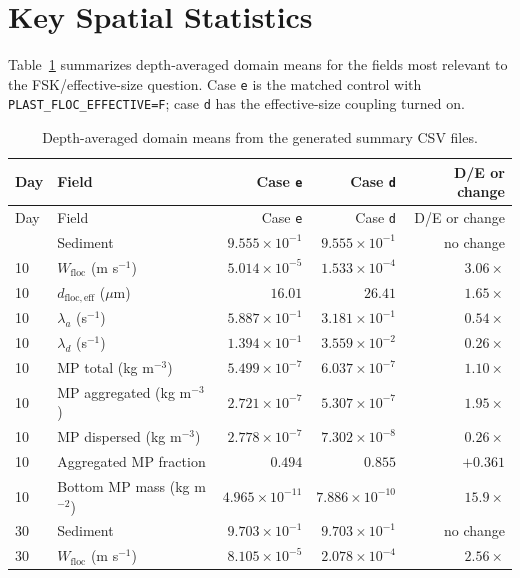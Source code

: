 \documentclass[11pt]{article}
\begin{document}
\section*{Key Spatial Statistics}

Table~\ref{tab:stats} summarizes depth-averaged domain means for the fields
most relevant to the FSK/effective-size question.  Case \texttt{e} is the
matched control with \texttt{PLAST\_FLOC\_EFFECTIVE=F}; case \texttt{d} has
the effective-size coupling turned on.

\small
\begin{longtable}{llrrr}
\caption{Depth-averaged domain means from the generated summary CSV files.}
\label{tab:stats}\\
\toprule
Day & Field & Case \texttt{e} & Case \texttt{d} & D/E or change \\
\midrule
\endfirsthead
\toprule
Day & Field & Case \texttt{e} & Case \texttt{d} & D/E or change \\
\midrule
\endhead
\bottomrule
\endfoot
10 & Sediment & $9.555{\times}10^{-1}$ & $9.555{\times}10^{-1}$ & no change \\
10 & $W_{\mathrm{floc}}$ (m s$^{-1}$) & $5.014{\times}10^{-5}$ & $1.533{\times}10^{-4}$ & $3.06{\times}$ \\
10 & $d_{\mathrm{floc,eff}}$ ($\mu$m) & $16.01$ & $26.41$ & $1.65{\times}$ \\
10 & $\lambda_a$ (s$^{-1}$) & $5.887{\times}10^{-1}$ & $3.181{\times}10^{-1}$ & $0.54{\times}$ \\
10 & $\lambda_d$ (s$^{-1}$) & $1.394{\times}10^{-1}$ & $3.559{\times}10^{-2}$ & $0.26{\times}$ \\
10 & MP total (kg m$^{-3}$) & $5.499{\times}10^{-7}$ & $6.037{\times}10^{-7}$ & $1.10{\times}$ \\
10 & MP aggregated (kg m$^{-3}$) & $2.721{\times}10^{-7}$ & $5.307{\times}10^{-7}$ & $1.95{\times}$ \\
10 & MP dispersed (kg m$^{-3}$) & $2.778{\times}10^{-7}$ & $7.302{\times}10^{-8}$ & $0.26{\times}$ \\
10 & Aggregated MP fraction & $0.494$ & $0.855$ & $+0.361$ \\
10 & Bottom MP mass (kg m$^{-2}$) & $4.965{\times}10^{-11}$ & $7.886{\times}10^{-10}$ & $15.9{\times}$ \\
\midrule
30 & Sediment & $9.703{\times}10^{-1}$ & $9.703{\times}10^{-1}$ & no change \\
30 & $W_{\mathrm{floc}}$ (m s$^{-1}$) & $8.105{\times}10^{-5}$ & $2.078{\times}10^{-4}$ & $2.56{\times}$ \\

\end{longtable}
\end{document}
